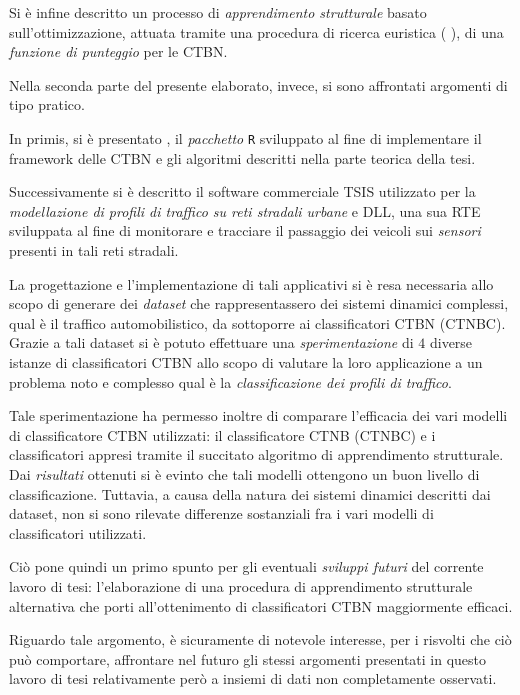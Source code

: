 Si è infine descritto un processo di \emph{apprendimento strutturale} basato sull'ottimizzazione, attuata tramite una procedura di ricerca euristica (\ie{} \emph{\hc{}}), di una \emph{funzione di punteggio} per le \acs{CTBN}.

Nella seconda parte del presente elaborato, invece, si sono affrontati argomenti di tipo pratico.

In primis, si è presentato \rctbn{}, il \emph{pacchetto} \lstinline$R$ sviluppato al fine di implementare il framework delle \acs{CTBN} e gli algoritmi descritti nella parte teorica della tesi.

Successivamente si è descritto il software commerciale \acs{TSIS} utilizzato per la \emph{modellazione di profili di traffico su reti stradali urbane} e  \acs{DLL}, una sua \acl{RTE} sviluppata al fine di monitorare e tracciare il passaggio dei veicoli sui \emph{sensori} presenti in tali reti stradali.

La progettazione e l'implementazione di tali applicativi si è resa necessaria allo scopo di generare dei \emph{dataset} che rappresentassero dei sistemi dinamici complessi, qual è il traffico automobilistico, da sottoporre ai classificatori \acs{CTBN} (\acs{CTNBC}). Grazie a tali dataset si è potuto effettuare una \emph{sperimentazione} di $4$ diverse istanze di classificatori \acs{CTBN} allo scopo di valutare la loro applicazione a un problema noto e complesso qual è la \emph{classificazione dei profili di traffico}.

Tale sperimentazione ha permesso inoltre di comparare l'efficacia dei vari modelli di classificatore \acs{CTBN} utilizzati: il classificatore \acl{CTNB} (\acs{CTNBC}) e i classificatori appresi tramite il succitato algoritmo di apprendimento strutturale. Dai \emph{risultati} ottenuti si è evinto che tali modelli ottengono un buon livello di classificazione. Tuttavia, a causa della natura dei sistemi dinamici descritti dai dataset, non si sono rilevate differenze sostanziali fra i vari modelli di classificatori utilizzati.

Ciò pone quindi un primo spunto per gli eventuali \emph{sviluppi futuri} del corrente lavoro di tesi: l'elaborazione di una procedura di apprendimento strutturale alternativa che porti all'ottenimento di classificatori \acs{CTBN} maggiormente efficaci.

Riguardo tale argomento, è sicuramente di notevole interesse, per i risvolti che ciò può comportare, affrontare nel futuro gli stessi argomenti presentati in questo lavoro di tesi relativamente però a insiemi di dati non completamente osservati.

